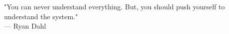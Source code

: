 
\cleardoublepage
{}
\thispagestyle{empty}

\vspace*{3cm}

\begin{center}
"You can never understand everything. 
But, you should push yourself to understand the system." \\ \medskip
--- Ryan Dahl 
\end{center}
